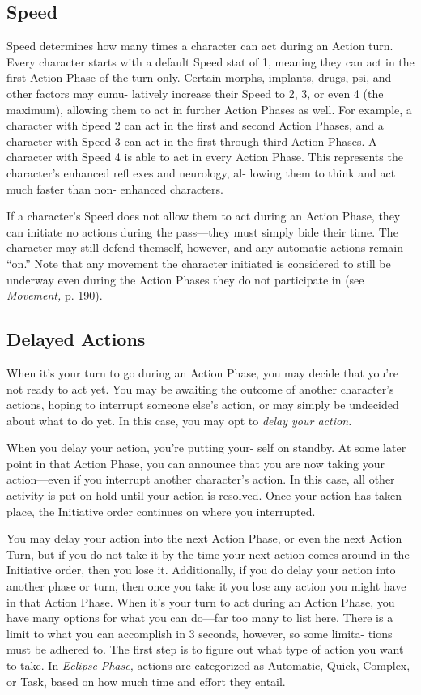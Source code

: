 \subsection{Speed}

Speed determines how many times a character can 
act during an Action turn. Every character starts with 
a default Speed stat of 1, meaning they can act in the 
first Action Phase of the turn only. Certain morphs, 
implants, drugs, psi, and other factors may cumu-
latively increase their Speed to 2, 3, or even 4 (the 
maximum), allowing them to act in further Action 
Phases as well. For example, a character with Speed 
2 can act in the first and second Action Phases, and 
a character with Speed 3 can act in the first through 
third Action Phases. A character with Speed 4 is 
able to act in every Action Phase. This represents 
the character's enhanced refl exes and neurology, al-
lowing them to think and act much faster than non-
enhanced characters.

If a character's Speed does not allow them to act 
during an Action Phase, they can initiate no actions 
during the pass—they must simply bide their time. 
The character may still defend themself, however, and 
any automatic actions remain ``on.'' Note that any 
movement the character initiated is considered to still 
be underway even during the Action Phases they do 
not participate in (see \textit{Movement,} p. 190).

\subsection{Delayed Actions}

When it's your turn to go during an Action Phase, 
you may decide that you're not ready to act yet. You 
may be awaiting the outcome of another character's 
actions, hoping to interrupt someone else's action, or 
may simply be undecided about what to do yet. In this 
case, you may opt to \textit{delay your action.}

When you delay your action, you're putting your-
self on standby. At some later point in that Action 
Phase, you can announce that you are now taking 
your action—even if you interrupt another character's 
action. In this case, all other activity is put on hold 
until your action is resolved. Once your action has 
taken place, the Initiative order continues on where 
you interrupted.

You may delay your action into the next Action 
Phase, or even the next Action Turn, but if you do not 
take it by the time your next action comes around in 
the Initiative order, then you lose it. Additionally, if 
you do delay your action into another phase or turn, 
then once you take it you lose any action you might 
have in that Action Phase.
When it's your turn to act during an Action Phase, 
you have many options for what you can do—far too 
many to list here. There is a limit to what you can 
accomplish in 3 seconds, however, so some limita-
tions must be adhered to. The first step is to figure 
out what type of action you want to take. In \textit{Eclipse }
\textit{Phase,} actions are categorized as Automatic, Quick, 
Complex, or Task, based on how much time and 
effort they entail.

